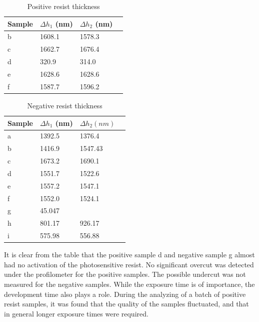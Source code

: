 \begin{table}[ht]
    \centering
    \caption{Positive resist thickness}
    \begin{tabular}{X l l l}
        Sample & $\Delta h_1$ (nm)& $\Delta h_2$ (nm) \\ 
        \hline\hline
        b & 1608.1  &   1578.3  \\
        c & 1662.7  &   1676.4  \\
        d & 320.9   &   314.0   \\
        e & 1628.6  &   1628.6  \\
        f & 1587.7  &   1596.2  \\
        \hline
    \end{tabular}
    \label{tab:pos_profile}
\end{table}

\begin{table}[H]
    \centering
    \caption{Negative resist thickness}
    \begin{tabular}{X l l l}
        Sample & $\Delta h_1$ (nm) & $\Delta h_2 (nm)$ \\ 
        \hline\hline
        a & 1392.5  &   1376.4  \\
        b & 1416.9  &   1547.43 \\
        c & 1673.2  &   1690.1  \\
        d & 1551.7  &   1522.6  \\
        e & 1557.2  &   1547.1  \\
        f & 1552.0  &   1524.1  \\
        g & 45.047  &   ~       \\
        h & 801.17  &   926.17  \\
        i & 575.98  &   556.88  \\
        \hline
    \end{tabular}
    \label{tab:neg_profile}
\end{table}



It is clear from the table that the positive sample d and negative sample g almost had no activation of the photosensitive resist. No significant overcut was detected under the profilometer for the positive samples. The possible undercut was not measured for the negative samples.
While the exposure time is of importance, the development time also plays a role. During the analyzing of a batch of positive resist samples, it was found that the quality of the samples fluctuated, and that in general longer exposure times were required. 


